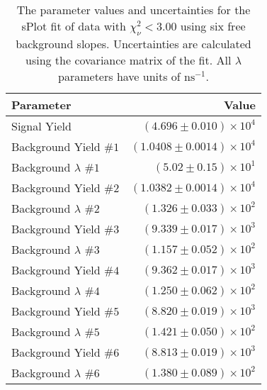 
\begin{table}[ht]
    \begin{center}
        \begin{tabular}{lr}\toprule
            Parameter & Value \\\midrule
            Signal Yield & $(4.696 \pm 0.010) \times 10^{4}$ \\
            Background Yield $\#1$ & $(1.0408 \pm 0.0014) \times 10^{4}$ \\
            Background $\lambda$ $\#1$ & $(5.02 \pm 0.15) \times 10^{1}$ \\
            Background Yield $\#2$ & $(1.0382 \pm 0.0014) \times 10^{4}$ \\
            Background $\lambda$ $\#2$ & $(1.326 \pm 0.033) \times 10^{2}$ \\
            Background Yield $\#3$ & $(9.339 \pm 0.017) \times 10^{3}$ \\
            Background $\lambda$ $\#3$ & $(1.157 \pm 0.052) \times 10^{2}$ \\
            Background Yield $\#4$ & $(9.362 \pm 0.017) \times 10^{3}$ \\
            Background $\lambda$ $\#4$ & $(1.250 \pm 0.062) \times 10^{2}$ \\
            Background Yield $\#5$ & $(8.820 \pm 0.019) \times 10^{3}$ \\
            Background $\lambda$ $\#5$ & $(1.421 \pm 0.050) \times 10^{2}$ \\
            Background Yield $\#6$ & $(8.813 \pm 0.019) \times 10^{3}$ \\
            Background $\lambda$ $\#6$ & $(1.380 \pm 0.089) \times 10^{2}$ \\\bottomrule
        \end{tabular}
        \caption{The parameter values and uncertainties for the sPlot fit of data with $\chi^2_\nu < 3.00$ using six free background slopes. Uncertainties are calculated using the covariance matrix of the fit. All $\lambda$ parameters have units of $\si{\nano\second}^{-1}$.}\label{tab:splot-fit-results-chisqdof-3.00-free-6}
    \end{center}
\end{table}
